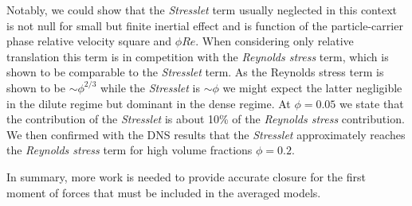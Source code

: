 \begin{enumerate}
    Notably, we could show that the \textit{Stresslet} term usually neglected in this context is not null for small but finite inertial effect and is function of the particle-carrier phase relative velocity square and $\phi Re$.  
    When considering only relative translation this term is in competition with the \textit{Reynolds stress} term, which is shown to be comparable to the \textit{Stresslet} term. 
    As the Reynolds stress term is shown to be $\sim \phi^{2/3}$ while the \textit{Stresslet} is $\sim \phi$ we might expect the latter negligible in the dilute regime but dominant in the dense regime. 
    At $\phi = 0.05$ we state that the contribution of the \textit{Stresslet} is about 10\% of the \textit{Reynolds stress} contribution. 
    We then confirmed with the DNS results that the \textit{Stresslet} approximately reaches the \textit{Reynolds stress} term for high volume fractions $\phi=0.2$. 
\end{enumerate}
In summary, more work is needed to provide accurate closure for the first moment of forces that must be included in the averaged models. 